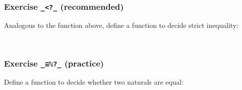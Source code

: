 \hypertarget{exercise-__-recommended}{%
\subsubsection{\texorpdfstring{Exercise \texttt{\_\textless{}?\_}
(recommended)}{Exercise \_\textless?\_ (recommended)}}\label{exercise-__-recommended}}

Analogous to the function above, define a function to decide strict
inequality:

\begin{fence}
\begin{code}%
\>[0]\<%
\\
\>[0][@{}l@{\AgdaIndent{0}}]%
\>[2]\AgdaSpace{}%
\AgdaSymbol{:}\AgdaSpace{}%
\AgdaSpace{}%
\AgdaSymbol{(}\AgdaSpace{}%
\AgdaSpace{}%
\AgdaSymbol{:}\AgdaSpace{}%
\AgdaSymbol{)}\AgdaSpace{}%
\AgdaSpace{}%
\AgdaSpace{}%
\AgdaSymbol{(}\AgdaSpace{}%
\AgdaOperator{\AgdaDatatype{<}}\AgdaSpace{}%
\AgdaSymbol{)}\<%
\end{code}
\end{fence}

\begin{fence}
\begin{code}%
\>[0]\<%
\end{code}
\end{fence}

\hypertarget{exercise-_ux2115_-practice}{%
\subsubsection{\texorpdfstring{Exercise \texttt{\_≡ℕ?\_}
(practice)}{Exercise \_≡ℕ?\_ (practice)}}\label{exercise-_ux2115_-practice}}

Define a function to decide whether two naturals are equal:

\begin{fence}
\begin{code}%
\>[0]\<%
\\
\>[0][@{}l@{\AgdaIndent{0}}]%
\>[2]\AgdaSpace{}%
\AgdaSymbol{:}\AgdaSpace{}%
\AgdaSpace{}%
\AgdaSymbol{(}\AgdaSpace{}%
\AgdaSpace{}%
\AgdaSymbol{:}\AgdaSpace{}%
\AgdaSymbol{)}\AgdaSpace{}%
\AgdaSpace{}%
\AgdaSpace{}%
\AgdaSymbol{(}\AgdaSpace{}%
\AgdaSpace{}%
\AgdaSymbol{)}\<%
\end{code}
\end{fence}

